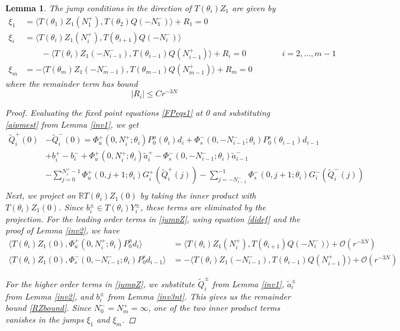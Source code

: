 \documentclass[12pt]{elsarticle}
\def\R{{\mathbb R}}
\newtheorem{lemma}{Lemma}
\begin{document}
\begin{lemma}\label{jumpZlemma}
The jump conditions in the direction of $T(\theta_i) Z_1$ are given by
\begin{equation*}
\begin{aligned}
\xi_1 &= \langle T(\theta_1) Z_1(N_1^+), T(\theta_{2}) Q(-N_1^-) \rangle + R_1 = 0 \\
\xi_i &= \langle T(\theta_i) Z_1(N_i^+), T(\theta_{i+1}) Q(-N_i^-) \rangle \\
&\qquad-\langle T(\theta_i) Z_1(-N_{i-1}^-), T(\theta_{i-1}) Q(N_{i-1}^+) \rangle + R_i = 0 && \qquad i = 2, \dots, m-1 \\
\xi_m &= -\langle T(\theta_m) Z_1(-N_{m-1}^-), T(\theta_{m-1}) Q(N_{m-1}^+) \rangle + R_m = 0
\end{aligned}
\end{equation*}
where the remainder term has bound
\begin{equation}\label{RZbound}
|R_i| \leq C r^{-3N}
\end{equation}
\begin{proof}
Evaluating the fixed point equations \eqref{FPeqs1} at 0 and substituting \eqref{aipmest} from Lemma \ref{inv1}, we get
\begin{align*}
\tilde{Q}_i^+(0) &- \tilde{Q}_i^-(0) = \Phi_u^+(0, N_i^+; \theta_i) P_0^u(\theta_i) d_i + \Phi_s^-(0, -N_{i-1}^-; \theta_i) P_0^s(\theta_{i-1}) d_{i-1} \\
&+ b_i^+ - b_i^- 
+ \Phi_u^+(0, N_i^+; \theta_i) \tilde{a}_i^+ - \Phi_s^-(0, -N_{i-1}^-; \theta_i) \tilde{a}_{i-1}^- \\
&- \sum_{j = 0}^{N_i^+-1} \Phi_u^+(0, j+1; \theta_i) G_i^+(\tilde{Q}_i^+(j)) 
- \sum_{j = -N_{i-1}^-}^{-1} \Phi_s^-(0, j+1; \theta_i) G_i^-(\tilde{Q}_i^-(j)) \\
\end{align*}
Next, we project on $\R T(\theta_i) Z_1(0)$ by taking the inner product with $T(\theta_i) Z_1(0)$. Since $b_i^\pm \in T(\theta_i) Y_i^\pm$, these terms are eliminated by the projection. For the leading order terms in \eqref{jumpZ}, using equation \eqref{didef} and the proof of Lemma \ref{inv2}, we have
\begin{align*}
\langle T(\theta_i) Z_1(0), \Phi_u^+(0, N_i^+; \theta_i) P_0^u d_i \rangle
&= \langle T(\theta_i) Z_1(N_i^+), T(\theta_{i+1}) Q(-N_i^-) \rangle + \mathcal{O}(r^{-3N}) \\
\langle T(\theta_i) Z_1(0), \Phi_s^-(0, -N_{i-1}^-; \theta_i) P_0^s d_{i-1} \rangle
&= -\langle T(\theta_i) Z_1(-N_{i-1}^-), T(\theta_{i-1}) Q(N_{i-1}^+) \rangle + \mathcal{O}(r^{-3N})
\end{align*}

For the higher order terms in \eqref{jumpZ}, we substitute $\tilde{Q}_i^\pm$ from Lemma \ref{inv1}, $\tilde{a}_i^\pm$ from Lemma \ref{inv2}, and $b_i^\pm$ from Lemma \ref{inv3nt}. This gives us the remainder bound \eqref{RZbound}. Since $N_0^- = N_m^+ = \infty$, one of the two inner product terms vanishes in the jumps $\xi_1$ and $\xi_m$. 
\end{proof}
\end{lemma}
\end{document}

